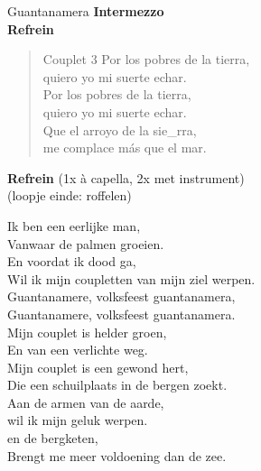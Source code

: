 \begin{song}[son]{Guantanamera}
\textbf{Intermezzo}\\
\textbf{Refrein}\\

\begin{verse}{Couplet 3}
  \hspace{1em} Por los pobres de la tierra,
  \\
  \hspace{1em} quiero yo mi suerte echar.
  \\
  \hspace{1em} Por los pobres de la tierra,
  \\
  quiero yo mi suerte echar.
  \\
  Que el arroyo de la sie\_rra,
  \\
  me complace m\'{a}s que el mar. \hspace{1em}
\end{verse}

\textbf{Refrein} (1x \`{a} capella, 2x met instrument)\\
(loopje einde:  roffelen)
\end{song}
\begin{translation}
Ik ben een eerlijke man,\\
Vanwaar de palmen groeien.\\
En voordat ik dood ga,\\
Wil ik mijn coupletten van mijn ziel werpen.\\
\vspace*{1\baselineskip}
Guantanamere, volksfeest guantanamera,\\
Guantanamere, volksfeest guantanamera.\\
\vspace*{1\baselineskip}
Mijn couplet is helder groen,\\
En van een verlichte weg.\\
Mijn couplet is een gewond hert,\\
Die een schuilplaats in de bergen zoekt.\\
\vspace*{1\baselineskip}
Aan de armen van de aarde,\\
wil ik mijn geluk werpen.\\
en de bergketen,\\
Brengt me meer voldoening dan de zee.\\
\end{translation}
